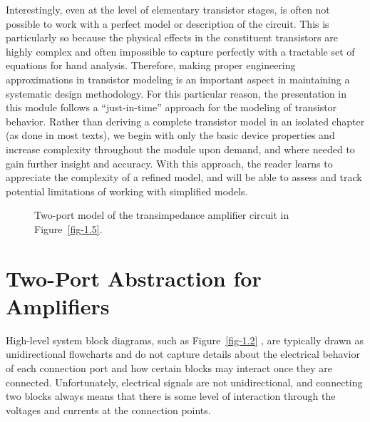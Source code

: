\documentclass[
  11pt,
  letterpaper,
  abstract]{scrbook}
\begin{document}
Interestingly, even at the level of elementary transistor stages, is
often not possible to work with a perfect model or description of the
circuit. This is particularly so because the physical effects in the
constituent transistors are highly complex and often impossible to
capture perfectly with a tractable set of equations for hand analysis.
Therefore, making proper engineering approximations in transistor
modeling is an important aspect in maintaining a systematic design
methodology. For this particular reason, the presentation in this module
follows a ``just-in-time'' approach for the modeling of transistor
behavior. Rather than deriving a complete transistor model in an
isolated chapter (as done in most texts), we begin with only the basic
device properties and increase complexity throughout the module upon
demand, and where needed to gain further insight and accuracy. With this
approach, the reader learns to appreciate the complexity of a refined
model, and will be able to assess and track potential limitations of
working with simplified models.

\begin{figure}


\caption{\label{fig-1.7}Two-port model of the transimpedance amplifier
circuit in Figure~\ref{fig-1.5}.}

\end{figure}%

\section{Two-Port Abstraction for
Amplifiers}\label{two-port-abstraction-for-amplifiers}

High-level system block diagrams, such as Figure~\ref{fig-1.2} , are
typically drawn as unidirectional flowcharts and do not capture details
about the electrical behavior of each connection port and how certain
blocks may interact once they are connected. Unfortunately, electrical
signals are not unidirectional, and connecting two blocks always means
that there is some level of interaction through the voltages and
currents at the connection points.
\end{document}
